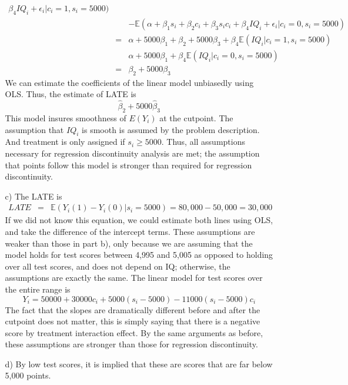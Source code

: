 \documentclass{article}
\def\E{{\mathbb E}}
\begin{document}
\begin{itemize}
\begin{itemize}
\begin{eqnarray*}
            \beta_4IQ_i + \epsilon_i | c_i =1, s_i = 5000) \\
            && - \E(\alpha + \beta_1s_i + \beta_2c_i + \beta_3 s_ic_i + 
            \beta_4IQ_i + \epsilon_i | c_i =0, s_i = 5000)\\
          & = & \alpha + 5000\beta_1 + \beta_2 + 5000\beta_3 + \beta_4\E(IQ_i | c_i = 1, s_i = 5000)\\
            && \alpha + 5000\beta_1 + \beta_4\E(IQ_i | c_i = 0, s_i = 5000) \\
          & = & \beta_2 + 5000\beta_3  
        \end{eqnarray*}
        We can estimate the coefficients of the linear model unbiasedly using OLS. 
        Thus, the estimate of LATE is
        $$
          \hat\beta_2 + 5000\hat\beta_3
        $$
        This model insures smoothness of $E(Y_i)$ at the cutpoint.
        The assumption that $IQ_i$ is smooth is assumed by the problem description.
        And treatment is only assigned if $s_i \geq 5000$. 
        Thus, all assumptions necessary for regression discontinuity analysis are met;
        the assumption that points follow this model is 
        stronger than required for regression discontinuity.\\
      \item[c)]
        The LATE is
        \begin{eqnarray*}
          LATE & = & \E(Y_i(1) - Y_i(0)| s_i = 5000) =  80,000 - 50,000 = 30,000
        \end{eqnarray*}
        If we did not know this equation, we could estimate both lines using OLS,
        and take the difference of the intercept terms.
        These assumptions are weaker than those in part b), only because we are assuming
        that the model holds for test scores
        between 4,995 and 5,005 as opposed to holding over all test scores, and 
        does not depend on IQ; 
        otherwise, the assumptions are exactly the same.
        The linear model for test scores over the entire range is
        $$
           Y_i = 50000 + 30000c_i + 5000(s_i - 5000) -11000(s_i - 5000)c_i
        $$
        The fact that the slopes are dramatically different before and after the cutpoint does not matter,
        this is simply saying that there is a negative score by treatment interaction effect.
        By the same arguments as before, these assumptions are stronger than those for 
        regression discontinuity.
      \item[d)]
        By low test scores, it is implied that these are scores that are far below 5,000 points.  

\end{itemize}
\end{itemize}
\end{document}
